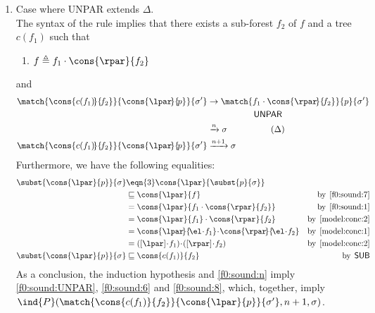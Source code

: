 \begin{enumerate}
\begin{enumerate}
      \item Case where \textsf{UNPAR} extends \(\Delta\).\\ The syntax
        of the rule implies that there exists a sub\hyp{}forest \(f_2\)
        of \(f\) and a tree \(c(f_1)\) such that
        \begin{enumerate}

          \item \label{f0:sound:1} \(f \triangleq f_1 \cdot
            \cons{\rpar}{f_2}\)

        \end{enumerate}
        and
        \begin{align}
          \match{\cons{c(f_1)\!}{\!f_2}}{\cons{\lpar\!}{\!p}}{\sigma'}
          &\rightarrow
          \match{f_1 \cdot \cons{\rpar\!}{\!f_2}}{p}{\sigma'}
          \notag\\
          & \qquad\qquad\quad\ \textsf{UNPAR} \notag\\
          &\xrightarrow{n} \sigma
          \qquad\qquad\quad(\Delta) \notag\\
          \match{\cons{c(f_1)\!}{\!f_2}}{\cons{\lpar\!}{\!p}}{\sigma'}
          &\xrightarrow{n+1} \sigma \label{f0:sound:UNPAR}
        \end{align}
        Furthermore, we have the following equalities:
        \begin{align}
          \subst{\cons{\lpar}{p}}{\sigma}
          &\eqn{3} \cons{\lpar}{\subst{p}{\sigma}}\notag\\
          &\sqsubseteq \cons{\lpar}{f}
          &\text{by} \,\; \eqref{f0:sound:7}\notag\\
          &= \cons{\lpar}{f_1 \cdot \cons{\rpar}{f_2}}
          &\text{by} \,\; \text{\ref{f0:sound:1}}\notag\\
          &= \cons{\lpar}{f_1} \cdot \cons{\rpar}{f_2}
          &\text{by} \,\; \eqref{model:conc:2}\notag\\
          &= \cons{\lpar\!}{\!\el\!\cdot\!f_1}
             \!\cdot\!\cons{\rpar\!}{\!\el\!\cdot\!f_2}
          &\text{by} \,\; \eqref{model:conc:1}\notag\\
          &= ([\lpar] \!\cdot\! f_1) \!\cdot\! ([\rpar] \!\cdot\! f_2)
          &\text{by} \,\; \eqref{model:conc:2}\notag\\
          \subst{\cons{\lpar}{p}}{\sigma}
          &\sqsubseteq \cons{c(f_1)}{f_2}
          &\text{by} \,\; \textsf{SUB} \label{f0:sound:8}
        \end{align}
        As a conclusion, the induction hypothesis and
        \eqref{f0:sound:n} imply \eqref{f0:sound:UNPAR},
        \eqref{f0:sound:6} and \eqref{f0:sound:8}, which, together,
        imply \(\ind{P}(\match{\cons{c(f_1)}{f_2}}{\cons{\lpar}{p}}%
        {\sigma'}, n+1, \sigma)\).


\end{enumerate}
\end{enumerate}
